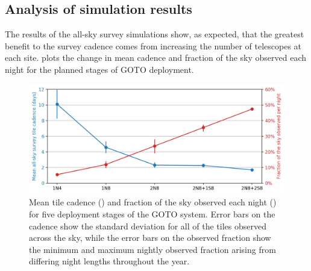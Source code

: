 \begin{colsection}

\subsection{Analysis of simulation results}
\label{sec:survey_sim_analysis}
\begin{colsection}

The results of the all-sky survey simulations show, as expected, that the greatest benefit to the survey cadence comes from increasing the number of telescopes at each site.  plots the change in mean cadence and fraction of the sky observed each night for the planned stages of GOTO deployment.

\begin{figure}[t]
    \begin{center}
        \includegraphics[width=\linewidth]{images/survey_sims/results.png}
    \end{center}
    \caption[Tile cadence and nightly sky observation for different GOTO systems]{
        Mean tile cadence () and fraction of the sky observed each night () for five deployment stages of the GOTO system. Error bars on the cadence show the standard deviation for all of the tiles observed across the sky, while the error bars on the observed fraction show the minimum and maximum nightly observed fraction arising from differing night lengths throughout the year.
    }\label{fig:survey_sim_results}
\end{figure}


\end{colsection}
\end{colsection}
